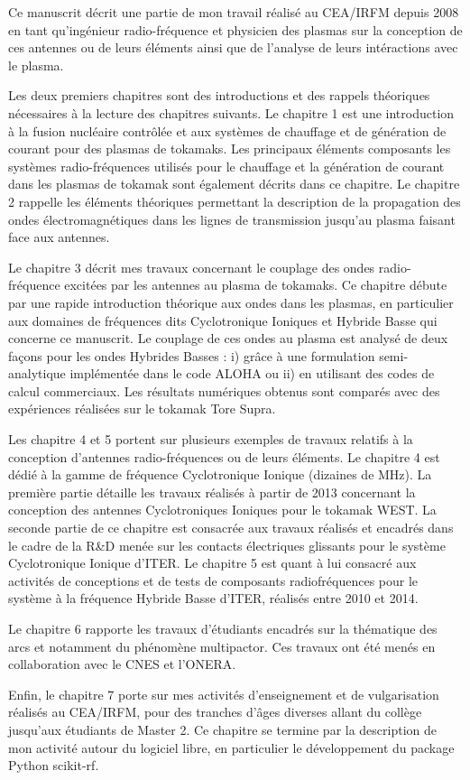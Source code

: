 Ce manuscrit décrit une partie de mon travail réalisé au CEA/IRFM depuis 2008 en tant qu'ingénieur radio-fréquence et physicien des plasmas sur la conception de ces antennes ou de leurs éléments ainsi que de l'analyse de leurs intéractions avec le plasma. 

Les deux premiers chapitres sont des introductions et des rappels théoriques nécessaires à la lecture des chapitres suivants. Le chapitre 1 est une introduction à la fusion nucléaire contrôlée et aux systèmes de chauffage et de génération de courant pour des plasmas de tokamaks. Les principaux éléments composants les systèmes radio-fréquences utilisés pour le chauffage et la génération de courant dans les plasmas de tokamak sont également décrits dans ce chapitre. Le chapitre 2 rappelle les éléments théoriques permettant la description de la propagation des ondes électromagnétiques dans les lignes de transmission jusqu'au plasma faisant face aux antennes.

Le chapitre 3 décrit mes travaux concernant le couplage des ondes radio-fréquence excitées par les antennes au plasma de tokamaks. Ce chapitre débute par une rapide introduction théorique aux ondes dans les plasmas, en particulier aux domaines de fréquences dits Cyclotronique Ioniques et Hybride Basse qui concerne ce manuscrit. Le couplage de ces ondes au plasma est analysé de deux façons pour les ondes Hybrides Basses : i) grâce à une formulation semi-analytique implémentée dans le code ALOHA ou ii) en utilisant des codes de calcul commerciaux. Les résultats numériques obtenus sont comparés avec  des expériences réalisées sur le tokamak Tore Supra.

Les chapitre 4 et 5 portent sur plusieurs exemples de travaux relatifs à la conception d'antennes radio-fréquences ou de leurs éléments. Le chapitre 4 est dédié à la gamme de fréquence Cyclotronique Ionique (dizaines de MHz). La première partie détaille les travaux réalisés à partir de 2013 concernant la conception des antennes Cyclotroniques Ioniques pour le tokamak WEST. La seconde partie de ce chapitre est consacrée aux travaux réalisés et encadrés dans le cadre de la R\&D menée sur les contacts électriques glissants pour le système Cyclotronique Ionique d'ITER. Le chapitre 5 est quant à lui consacré aux activités de conceptions et de tests de composants radiofréquences pour le système à la fréquence Hybride Basse d'ITER, réalisés entre 2010 et 2014.

Le chapitre 6 rapporte les travaux d'étudiants encadrés sur la thématique des arcs et notamment du phénomène multipactor. Ces travaux ont été menés en collaboration avec le CNES et l'ONERA.

Enfin, le chapitre 7 porte sur mes activités d'enseignement et de vulgarisation réalisés au CEA/IRFM, pour des tranches d'âges diverses allant du collège jusqu'aux étudiants de Master 2. Ce chapitre se termine par la description de mon activité autour du logiciel libre, en particulier le développement du package Python scikit-rf.




